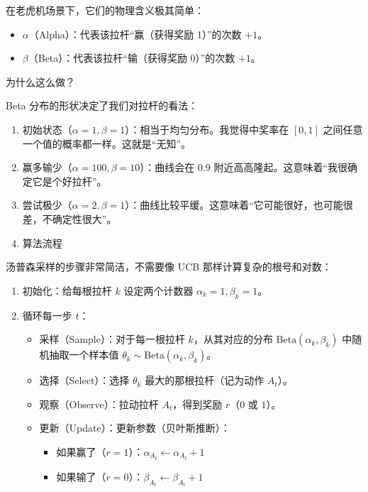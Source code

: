在老虎机场景下，它们的物理含义极其简单：

\begin{itemize}
\tightlist
\item
  \(\alpha\)（Alpha）：代表该拉杆``赢（获得奖励 1）''的次数 \(+1\)。
\item
  \(\beta\)（Beta）：代表该拉杆``输（获得奖励 0）''的次数 \(+1\)。
\end{itemize}

为什么这么做？

Beta 分布的形状决定了我们对拉杆的看法：

\begin{enumerate}
\def\labelenumi{\arabic{enumi}.}
\item
  初始状态（\(\alpha=1,\beta=1\)）：相当于均匀分布。我觉得中奖率在 \([0,1]\) 之间任意一个值的概率都一样。这就是``无知''。
\item
  赢多输少（\(\alpha=100,\beta=10\)）：曲线会在 \(0.9\) 附近高高隆起。这意味着``我很确定它是个好拉杆''。
\item
  尝试极少（\(\alpha=2,\beta=1\)）：曲线比较平缓。这意味着``它可能很好，也可能很差，不确定性很大''。
\item
  算法流程
\end{enumerate}

汤普森采样的步骤非常简洁，不需要像 UCB 那样计算复杂的根号和对数：

\begin{enumerate}
\def\labelenumi{\arabic{enumi}.}
\tightlist
\item
  初始化：给每根拉杆 \(k\) 设定两个计数器 \(\alpha_k=1,\beta_k=1\)。
\item
{}
  循环每一步 \(t\)：

  \begin{itemize}
  \item
    采样（Sample）：对于每一根拉杆 \(k\)，从其对应的分布 \(\mathrm{Beta}(\alpha_k,\beta_k)\) 中随机抽取一个样本值 \(\theta_k\sim \mathrm{Beta}(\alpha_k,\beta_k)\)。
  \item
    选择（Select）：选择 \(\theta_k\) 最大的那根拉杆（记为动作 \(A_t\)）。
  \item
    观察（Observe）：拉动拉杆 \(A_t\)，得到奖励 \(r\)（\(0\) 或 \(1\)）。
  \item
{}
    更新（Update）：更新参数（贝叶斯推断）：

    \begin{itemize}
    \tightlist
    \item
      如果赢了（\(r=1\)）：\(\alpha_{A_t}\leftarrow \alpha_{A_t}+1\)
    \item
      如果输了（\(r=0\)）：\(\beta_{A_t}\leftarrow \beta_{A_t}+1\)
    \end{itemize}
  \end{itemize}
\end{enumerate}

